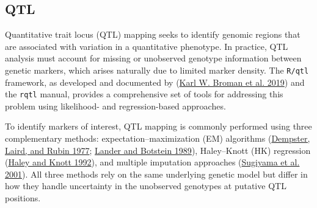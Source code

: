 \documentclass[
  12pt,
]{article}
\begin{document}

\subsection{QTL}

Quantitative trait locus (QTL) mapping seeks to identify genomic regions
that are associated with variation in a quantitative phenotype. In
practice, QTL analysis must account for missing or unobserved genotype
information between genetic markers, which arises naturally due to
limited marker density. The \texttt{R/qtl} framework, as developed and
documented by (\protect\hyperlink{ref-Broman2019}{Karl W. Broman et al.
2019}) and the \texttt{rqtl} manual, provides a comprehensive set of
tools for addressing this problem using likelihood- and regression-based
approaches.

To identify markers of interest, QTL mapping is commonly performed using
three complementary methods: expectation--maximization (EM) algorithms
(\protect\hyperlink{ref-dempster1977maximum}{Dempster, Laird, and Rubin
1977}; \protect\hyperlink{ref-lander1989mapping}{Lander and Botstein
1989}), Haley--Knott (HK) regression
(\protect\hyperlink{ref-haley1992simple}{Haley and Knott 1992}), and
multiple imputation approaches
(\protect\hyperlink{ref-sugiyama2001concordance}{Sugiyama et al. 2001}).
All three methods rely on the same underlying genetic model but differ
in how they handle uncertainty in the unobserved genotypes at putative
QTL positions.
\end{document}
